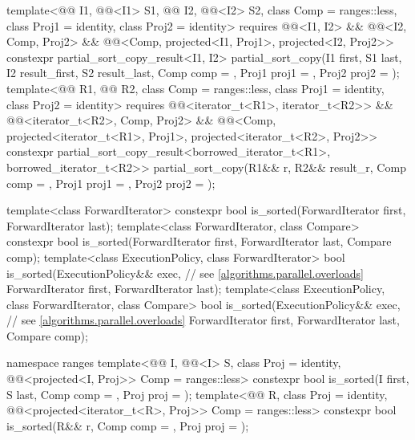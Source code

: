 \begin{codeblock}
{{    template<@@ I1, @@<I1> S1,
             @@ I2, @@<I2> S2,
             class Comp = ranges::less, class Proj1 = identity, class Proj2 = identity>
      requires @@<I1, I2> && @@<I2, Comp, Proj2> &&
               @@<Comp, projected<I1, Proj1>, projected<I2, Proj2>>
      constexpr partial_sort_copy_result<I1, I2>
        partial_sort_copy(I1 first, S1 last, I2 result_first, S2 result_last,
                          Comp comp = {}, Proj1 proj1 = {}, Proj2 proj2 = {});
    template<@@ R1, @@ R2, class Comp = ranges::less,
             class Proj1 = identity, class Proj2 = identity>
      requires @@<iterator_t<R1>, iterator_t<R2>> &&
               @@<iterator_t<R2>, Comp, Proj2> &&
               @@<Comp, projected<iterator_t<R1>, Proj1>,
                                          projected<iterator_t<R2>, Proj2>>
      constexpr partial_sort_copy_result<borrowed_iterator_t<R1>, borrowed_iterator_t<R2>>
        partial_sort_copy(R1&& r, R2&& result_r, Comp comp = {},
                          Proj1 proj1 = {}, Proj2 proj2 = {});
  }

  template<class ForwardIterator>
    constexpr bool is_sorted(ForwardIterator first, ForwardIterator last);
  template<class ForwardIterator, class Compare>
    constexpr bool is_sorted(ForwardIterator first, ForwardIterator last,
                             Compare comp);
  template<class ExecutionPolicy, class ForwardIterator>
    bool is_sorted(ExecutionPolicy&& exec,                      // see \ref{algorithms.parallel.overloads}
                   ForwardIterator first, ForwardIterator last);
  template<class ExecutionPolicy, class ForwardIterator, class Compare>
    bool is_sorted(ExecutionPolicy&& exec,                      // see \ref{algorithms.parallel.overloads}
                   ForwardIterator first, ForwardIterator last,
                   Compare comp);

  namespace ranges {
    template<@@ I, @@<I> S, class Proj = identity,
             @@<projected<I, Proj>> Comp = ranges::less>
      constexpr bool is_sorted(I first, S last, Comp comp = {}, Proj proj = {});
    template<@@ R, class Proj = identity,
             @@<projected<iterator_t<R>, Proj>> Comp = ranges::less>
      constexpr bool is_sorted(R&& r, Comp comp = {}, Proj proj = {});
  }

}
\end{codeblock}
